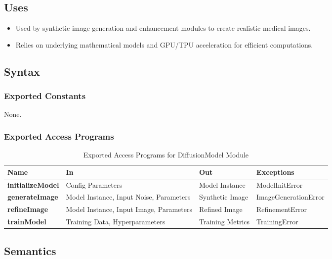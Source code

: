 \documentclass[12pt, titlepage]{article}
\begin{document}
\subsection{Uses}
\begin{itemize}
    \item Used by synthetic image generation and enhancement modules to create realistic medical images.
    \item Relies on underlying mathematical models and GPU/TPU acceleration for efficient computations.
\end{itemize}

\subsection{Syntax}

\subsubsection{Exported Constants}
None.

\subsubsection{Exported Access Programs}

\begin{table}[h!]
\centering
\begin{tabular}{|p{4cm}|p{5cm}|p{5cm}|p{4cm}|}
    \hline
    \textbf{Name} & \textbf{In} & \textbf{Out} & \textbf{Exceptions} \\
    \hline
    \textbf{initializeModel} & Config Parameters & Model Instance & ModelInitError \\
    \hline
    \textbf{generateImage} & Model Instance, Input Noise, Parameters & Synthetic Image & ImageGenerationError \\
    \hline
    \textbf{refineImage} & Model Instance, Input Image, Parameters & Refined Image & RefinementError \\
    \hline
    \textbf{trainModel} & Training Data, Hyperparameters & Training Metrics & TrainingError \\
    \hline
\end{tabular}
\caption{Exported Access Programs for DiffusionModel Module}
\label{table:diffusionModel}
\end{table}

\subsection{Semantics}
\end{document}
